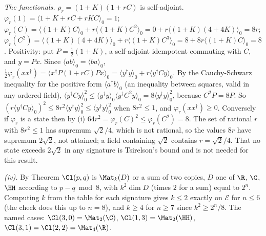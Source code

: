 \emph{The functionals.} $\rho_{r} = (1 + K)(1 + rC)$ is self-adjoint. $\varphi_{r}(1) = \langle 1 + K + rC + rKC\rangle_{0} = 1$; $\varphi_{r}(C) = \langle(1 + K)C\rangle_{0} + r\langle(1 + K)C^{2}\rangle_{0} = 0 + r\langle(1 + K)(4 + 4K)\rangle_{0} = 8r$; $\varphi_{r}(C^{2}) = \langle(1 + K)(4 + 4K)\rangle_{0} + r\langle(1+K)C^{3}\rangle_{0} = 8 + 8r\langle(1 + K)C\rangle_{0} = 8$. Positivity: put $P = \tfrac12(1 + K)$, a self-adjoint idempotent commuting with $C$, and $y = Px$. Since $\langle ab\rangle_{0} = \langle ba\rangle_{0}$, $\tfrac12\varphi_{r}(xx^{\dagger}) = \langle x^{\dagger}P(1 + rC)Px\rangle_{0} = \langle y^{\dagger}y\rangle_{0} + r\langle y^{\dagger}Cy\rangle_{0}$. By the Cauchy-Schwarz inequality for the positive form $\langle a^{\dagger}b\rangle_{0}$ (an inequality between squares, valid in any ordered field), $\langle y^{\dagger}Cy\rangle_{0}^{2} \le \langle y^{\dagger}y\rangle_{0}\langle y^{\dagger}C^{2}y\rangle_{0} = 8\langle y^{\dagger}y\rangle_{0}^{2}$, because $C^{2}P = 8P$. So $(r\langle y^{\dagger}Cy\rangle_{0})^{2} \le 8r^{2}\langle y^{\dagger}y\rangle_{0}^{2} \le \langle y^{\dagger}y\rangle_{0}^{2}$ when $8r^{2} \le 1$, and $\varphi_{r}(xx^{\dagger}) \ge 0$. Conversely if $\varphi_{r}$ is a state then by (i) $64r^{2} = \varphi_{r}(C)^{2} \le \varphi_{r}(C^{2}) = 8$. The set of rational $r$ with $8r^{2} \le 1$ has supremum $\sqrt{2}/4$, which is not rational, so the values $8r$ have supremum $2\sqrt{2}$, not attained; a field containing $\sqrt{2}$ contains $r = \sqrt{2}/4$. That no state exceeds $2\sqrt{2}$ in any signature is Tsirelson's bound and is not needed for this result.

\emph{(iv).} By Theorem  $\Cl(p,q)$ is $\Mat_{k}(D)$ or a sum of two copies, $D$ one of $\R$, $\C$, $\HH$ according to $p - q \bmod 8$, with $k^{2}\dim D$ (times $2$ for a sum) equal to $2^{n}$. Computing $k$ from the table for each signature gives $k \le 2$ exactly on $\mathcal{E}$ for $n \le 6$ (the check does this up to $n = 8$), and $k \ge 4$ for $n \ge 7$ since $k^{2} \ge 2^{n}/8$. The named cases: $\Cl(3,0) = \Mat_{2}(\C)$, $\Cl(1,3) = \Mat_{2}(\HH)$, $\Cl(3,1) = \Cl(2,2) = \Mat_{4}(\R)$.
